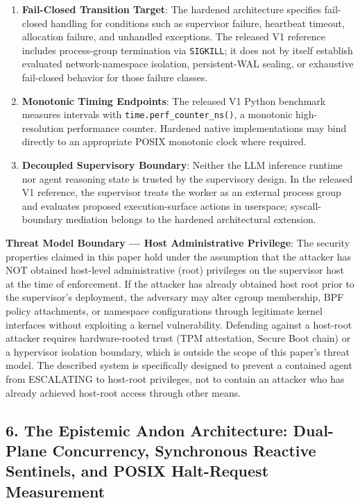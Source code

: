 \documentclass[
  10pt,letterpaper]{article}
\providecommand{\tightlist}{%
  \setlength{\itemsep}{0pt}\setlength{\parskip}{0pt}}
\begin{document}
\begin{enumerate}
\def\labelenumi{\arabic{enumi}.}
\setcounter{enumi}{1}
\tightlist
\item
  \textbf{Fail-Closed Transition Target}: The hardened architecture
  specifies fail-closed handling for conditions such as supervisor failure,
  heartbeat timeout, allocation failure, and unhandled exceptions. The
  released V1 reference includes process-group termination via
  \texttt{SIGKILL}; it does not by itself establish evaluated
  network-namespace isolation, persistent-WAL sealing, or exhaustive
  fail-closed behavior for those failure classes.
\item
  \textbf{Monotonic Timing Endpoints}: The released V1 Python benchmark
  measures intervals with \texttt{time.perf\_counter\_ns()}, a monotonic
  high-resolution performance counter. Hardened native implementations may
  bind directly to an appropriate POSIX monotonic clock where required.
\item
  \textbf{Decoupled Supervisory Boundary}: Neither the LLM inference
  runtime nor agent reasoning state is trusted by the supervisory design.
  In the released V1 reference, the supervisor treats the worker as an
  external process group and evaluates proposed execution-surface actions in
  userspace; syscall-boundary mediation belongs to the hardened architectural
  extension.
\end{enumerate}

\textbf{Threat Model Boundary --- Host Administrative Privilege}: The
security properties claimed in this paper hold under the assumption that
the attacker has NOT obtained host-level administrative (root)
privileges on the supervisor host at the time of enforcement. If the
attacker has already obtained host root prior to the supervisor's
deployment, the adversary may alter cgroup membership, BPF policy
attachments, or namespace configurations through legitimate kernel
interfaces without exploiting a kernel vulnerability. Defending against
a host-root attacker requires hardware-rooted trust (TPM attestation,
Secure Boot chain) or a hypervisor isolation boundary, which is outside
the scope of this paper's threat model. The described system is
specifically designed to prevent a contained agent from ESCALATING to
host-root privileges, not to contain an attacker who has already
achieved host-root access through other means.

\subsection{6. The Epistemic Andon Architecture: Dual-Plane Concurrency,
Synchronous Reactive Sentinels, and POSIX Halt-Request Measurement}
\label{the-epistemic-andon-architecture-dual-plane-concurrency-synchronous-reactive-sentinels-and-posix-halt-request-measurement}
\end{document}
